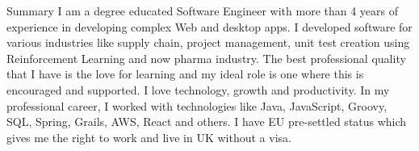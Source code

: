 \documentclass[]{mcdowellcv}
\begin{document}
   \makeheader

  \begin{cvsection}{Summary}
	    \hspace{\parindent} \hspace{\parindent} \hspace{\parindent} \hspace{\parindent} I am a degree educated Software Engineer with more than 4 years of experience in developing complex Web and desktop apps.
		I developed software for various industries like supply chain, project management, unit test creation using Reinforcement Learning and now pharma industry.
		The best professional quality that I have is the love for learning and my ideal role is one where this is encouraged and supported.
		I love technology, growth and productivity.
		In my professional career, I worked with technologies like Java, JavaScript, Groovy, SQL, Spring, Grails, AWS, React and others.
I have EU pre-settled status which gives me the right to work and live in UK without a visa.
  \end{cvsection}
\end{document}

